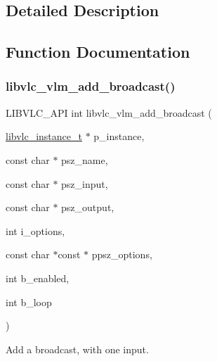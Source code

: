 \subsection{Detailed Description}


\subsection{Function Documentation}
\mbox{\label{group__libvlc__vlm_gaa8d58569f07229edabe9fdaab41b1c3d}} 
\subsubsection{\texorpdfstring{libvlc\+\_\+vlm\+\_\+add\+\_\+broadcast()}{libvlc\_vlm\_add\_broadcast()}}
{\footnotesize\ttfamily L\+I\+B\+V\+L\+C\+\_\+\+A\+PI int libvlc\+\_\+vlm\+\_\+add\+\_\+broadcast (\begin{DoxyParamCaption}\item[{\hyperlink{group__libvlc__core_ga316d739a80da4678206c79f4d6c2e284}{libvlc\+\_\+instance\+\_\+t} $\ast$}]{p\+\_\+instance,  }\item[{const char $\ast$}]{psz\+\_\+name,  }\item[{const char $\ast$}]{psz\+\_\+input,  }\item[{const char $\ast$}]{psz\+\_\+output,  }\item[{int}]{i\+\_\+options,  }\item[{const char $\ast$const $\ast$}]{ppsz\+\_\+options,  }\item[{int}]{b\+\_\+enabled,  }\item[{int}]{b\+\_\+loop }\end{DoxyParamCaption})}

Add a broadcast, with one input.


